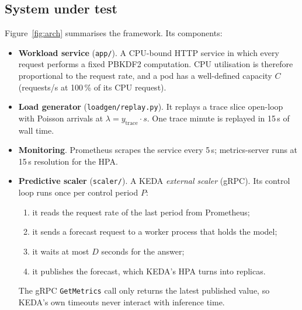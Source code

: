 \documentclass[11pt,a4paper]{article}
\begin{document}
\subsection{System under test}
Figure~\ref{fig:arch} summarises the framework. Its components:
\begin{itemize}
\item \textbf{Workload service} (\texttt{app/}). A CPU-bound HTTP service in which every request performs a
      fixed PBKDF2 computation. CPU utilisation is therefore proportional to the request rate, and a pod has a
      well-defined capacity $C$ (requests/s at 100\,\% of its CPU request).
\item \textbf{Load generator} (\texttt{loadgen/replay.py}). It replays a trace slice open-loop with Poisson
      arrivals at $\lambda = y_{\text{trace}}\cdot s$. One trace minute is replayed in 15\,s of wall time.
\item \textbf{Monitoring}. Prometheus scrapes the service every 5\,s; metrics-server runs at 15\,s resolution
      for the HPA.
\item \textbf{Predictive scaler} (\texttt{scaler/}). A KEDA \emph{external scaler} (gRPC). Its control loop
      runs once per control period $P$:
      \begin{enumerate}
      \item it reads the request rate of the last period from Prometheus;
      \item it sends a forecast request to a worker process that holds the model;
      \item it waits at most $D$ seconds for the answer;
      \item it publishes the forecast, which KEDA's HPA turns into replicas.
      \end{enumerate}
      The gRPC \texttt{GetMetrics} call only returns the latest published value, so KEDA's own timeouts never
      interact with inference time.
\end{itemize}
\end{document}
